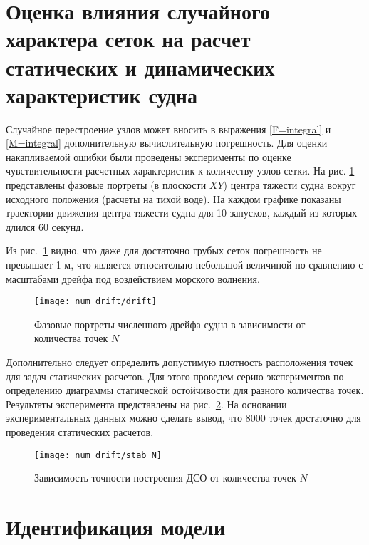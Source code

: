\section{Оценка влияния случайного характера сеток на расчет статических и динамических характеристик судна}

Случайное перестроение узлов может вносить в выражения \eqref{F=integral} и \eqref{M=integral} дополнительную вычислительную погрешность. Для оценки накапливаемой ошибки были проведены эксперименты по оценке чувствительности расчетных характеристик к количеству узлов сетки. На рис. \ref{drift} представлены фазовые портреты  (в плоскости $XY$) центра тяжести судна вокруг исходного положения (расчеты на тихой воде). На каждом графике показаны траектории движения центра тяжести судна для 10 запусков, каждый из которых длился 60 секунд.

Из рис.~\ref{drift} видно, что даже для достаточно грубых сеток погрешность не превышает 1 м, что является относительно небольшой величиной по сравнению с масштабами дрейфа под воздействием морского волнения.

\begin{figure}[h!]
\begin{center}
\texttt{[image: num\_drift/drift]}
\end{center}
\caption{Фазовые портреты численного дрейфа судна в зависимости от количества точек $N$ }
\label{drift}
\end{figure}

Дополнительно следует определить допустимую плотность расположения точек для задач статических расчетов.
Для этого проведем серию экспериментов по определению диаграммы статической остойчивости для разного количества точек. Результаты эксперимента представлены на рис.~\ref{drift:stabNN}. На основании экспериментальных данных можно сделать вывод, что 8000 точек достаточно для проведения статических расчетов.

\begin{figure}[h!]
\begin{center}
\texttt{[image: num\_drift/stab\_N]}
\end{center}
\caption{Зависимость точности построения ДСО от количества точек $N$ }
\label{drift:stabNN}
\end{figure}



\section{Идентификация модели}

